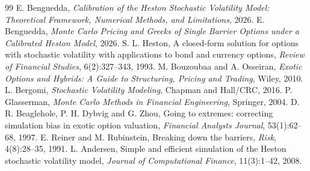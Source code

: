 \documentclass[11pt,a4paper]{article}
\begin{document}
\begin{thebibliography}{99}
 E. Benguedda, \emph{Calibration of the Heston Stochastic Volatility Model: Theoretical
Framework, Numerical Methods, and Limitations}, 2026.
 E. Benguedda, \emph{Monte Carlo Pricing and Greeks of Single Barrier Options under a
Calibrated Heston Model}, 2026.
 S. L. Heston, A closed-form solution for options with stochastic volatility with applications
to bond and currency options, \emph{Review of Financial Studies}, 6(2):327--343, 1993.
 M. Bouzoubaa and A. Osseiran, \emph{Exotic Options and Hybrids: A Guide to Structuring,
Pricing and Trading}, Wiley, 2010.
 L. Bergomi, \emph{Stochastic Volatility Modeling}, Chapman and Hall/CRC, 2016.
 P. Glasserman, \emph{Monte Carlo Methods in Financial Engineering}, Springer, 2004.
 D. R. Beaglehole, P. H. Dybvig and G. Zhou, Going to extremes: correcting simulation bias
in exotic option valuation, \emph{Financial Analysts Journal}, 53(1):62--68, 1997.
 E. Reiner and M. Rubinstein, Breaking down the barriers, \emph{Risk}, 4(8):28--35, 1991.
 L. Andersen, Simple and efficient simulation of the Heston stochastic volatility model,
\emph{Journal of Computational Finance}, 11(3):1--42, 2008.
\end{thebibliography}
\end{document}
